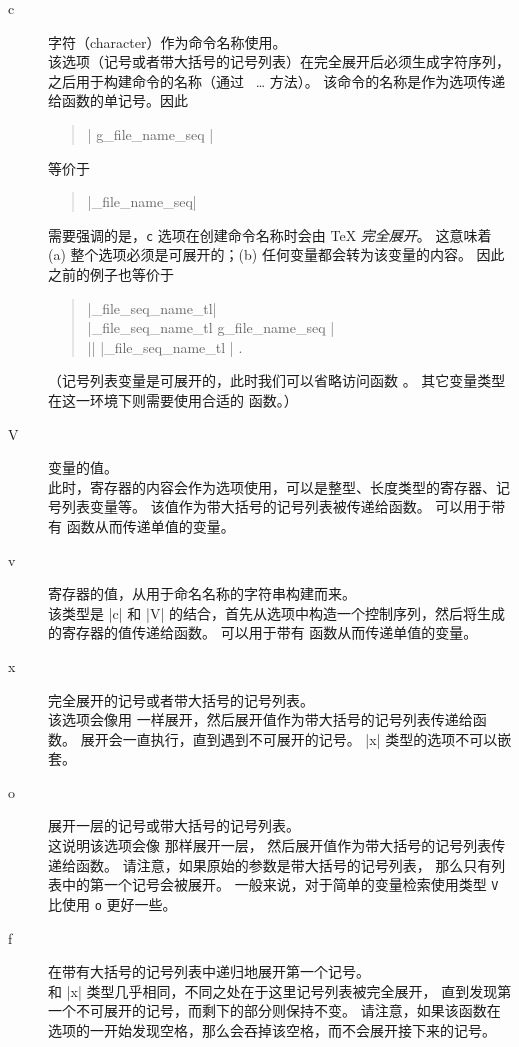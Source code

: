 \documentclass{l3doc}
\begin{document}
\begin{description}
    \item[c] 字符（character）作为命令名称使用。\\
        该选项（记号或者带大括号的记号列表）在完全展开后必须生成字符序列，
        之后用于构建命令的名称（通过~ \ldots {} 方法）。
        该命令的名称是作为选项传递给函数的单记号。因此
        \begin{quote}
             |{ g_file_name_seq }| 
        \end{quote}
        等价于
        \begin{quote}
             |\g_file_name_seq| 
        \end{quote}
        需要强调的是，\texttt{c} 选项在创建命令名称时会由 \TeX{} \emph{完全展开}。
        这意味着 (a) 整个选项必须是可展开的；(b) 任何变量都会转为该变量的内容。
        因此之前的例子也等价于
        \begin{quote}
             |\g_file_seq_name_tl| \\
             |\g_file_seq_name_tl { g_file_name_seq }| \\
             |{|  |\g_file_seq_name_tl }| .
        \end{quote}
        （记号列表变量是可展开的，此时我们可以省略访问函数 。
        其它变量类型在这一环境下则需要使用合适的  函数。）
    \item[V] 变量的值。\\
        此时，寄存器的内容会作为选项使用，可以是整型、长度类型的寄存器、记号列表变量等。
        该值作为带大括号的记号列表被传递给函数。
        可以用于带有  函数从而传递单值的变量。
    \item[v] 寄存器的值，从用于命名名称的字符串构建而来。\\
        该类型是 |c| 和 |V| 的结合，首先从选项中构造一个控制序列，然后将生成的寄存器的值传递给函数。
        可以用于带有  函数从而传递单值的变量。
    \item[x] 完全展开的记号或者带大括号的记号列表。\\
        该选项会像用  一样展开，然后展开值作为带大括号的记号列表传递给函数。
        展开会一直执行，直到遇到不可展开的记号。
        |x| 类型的选项不可以嵌套。
    \item[o] 展开一层的记号或带大括号的记号列表。\\
        这说明该选项会像  那样展开一层，
        然后展开值作为带大括号的记号列表传递给函数。
        请注意，如果原始的参数是带大括号的记号列表，
        那么只有列表中的第一个记号会被展开。
        一般来说，对于简单的变量检索使用类型 \texttt{V} 比使用 \texttt{o} 更好一些。
    \item[f] 在带有大括号的记号列表中递归地展开第一个记号。\\
        和 |x| 类型几乎相同，不同之处在于这里记号列表被完全展开，
        直到发现第一个不可展开的记号，而剩下的部分则保持不变。
        请注意，如果该函数在选项的一开始发现空格，那么会吞掉该空格，而不会展开接下来的记号。
\end{description}
\end{document}
